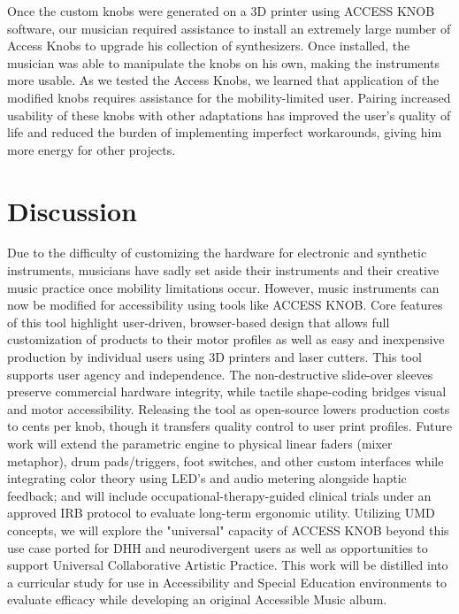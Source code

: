 \documentclass[manuscript,screen,review,anonymous]{acmart}
\begin{document}
Once the custom knobs were generated on a 3D printer using ACCESS KNOB software, our musician required assistance to install an extremely large number of Access Knobs to upgrade his collection of synthesizers. Once installed, the musician was able to manipulate the knobs on his own, making the instruments more usable. As we tested the Access Knobs, we learned that application of the modified knobs requires assistance for the mobility-limited user. Pairing increased usability of these knobs with other adaptations has improved the user's quality of life and reduced the burden of implementing imperfect workarounds, giving him more energy for other projects.

\section{Discussion} %

Due to the difficulty of customizing the hardware for electronic and synthetic instruments, musicians have sadly set aside their instruments and their creative music practice once mobility limitations occur. However, music instruments can now be modified for accessibility using tools like ACCESS KNOB. Core features of this tool highlight user-driven, browser-based design that allows full customization of products to their motor profiles as well as easy and inexpensive production by individual users using 3D printers and laser cutters. This tool supports user agency and independence. The non-destructive slide-over sleeves preserve commercial hardware integrity, while tactile shape-coding bridges visual and motor accessibility. Releasing the tool as open-source lowers production costs to cents per knob, though it transfers quality control to user print profiles. Future work will extend the parametric engine to physical linear faders (mixer metaphor), drum pads/triggers, foot switches, and other custom interfaces while integrating color theory using LED's and audio metering alongside haptic feedback; and will include occupational-therapy-guided clinical trials under an approved IRB protocol to evaluate long-term ergonomic utility. Utilizing UMD concepts, we will explore the "universal" capacity of ACCESS KNOB beyond this use case ported for DHH and neurodivergent users as well as opportunities to support Universal Collaborative Artistic Practice. This work will be distilled into a curricular study for use in Accessibility and Special Education environments to evaluate efficacy while developing an original Accessible Music album. 
\end{document}
